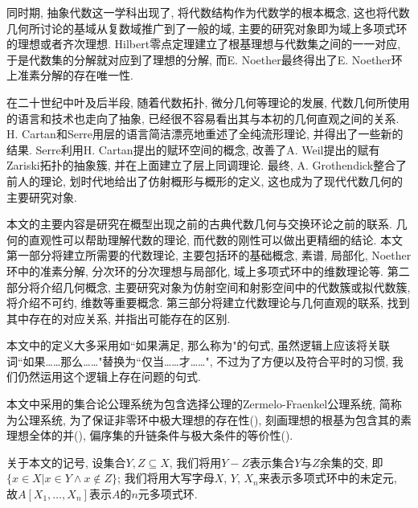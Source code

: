 同时期, 抽象代数这一学科出现了, 将代数结构作为代数学的根本概念, 这也将代数几何所讨论的基域从复数域推广到了一般的域, 主要的研究对象即为域上多项式环的理想或者齐次理想. Hilbert零点定理建立了根基理想与代数集之间的一一对应, 于是代数集的分解就对应到了理想的分解, 而E. Noether最终得出了E. Noether环上准素分解的存在唯一性.

在二十世纪中叶及后半段, 随着代数拓扑, 微分几何等理论的发展, 代数几何所使用的语言和技术也走向了抽象, 已经很不容易看出其与本初的几何直观之间的关系. H. Cartan和Serre用层的语言简洁漂亮地重述了全纯流形理论, 并得出了一些新的结果. Serre利用H. Cartan提出的赋环空间的概念, 改善了A. Weil提出的赋有Zariski拓扑的抽象簇, 并在上面建立了层上同调理论. 最终, A. Grothendick整合了前人的理论, 划时代地给出了仿射概形与概形的定义, 这也成为了现代代数几何的主要研究对象.

本文的主要内容是研究在概型出现之前的古典代数几何与交换环论之前的联系. 几何的直观性可以帮助理解代数的理论, 而代数的刚性可以做出更精细的结论. 本文第一部分将建立所需要的代数理论, 主要包括环的基础概念, 素谱, 局部化, Noether环中的准素分解, 分次环的分次理想与局部化, 域上多项式环中的维数理论等. 第二部分将介绍几何概念, 主要研究对象为仿射空间和射影空间中的代数簇或拟代数簇, 将介绍不可约, 维数等重要概念. 第三部分将建立代数理论与几何直观的联系, 找到其中存在的对应关系, 并指出可能存在的区别.

本文中的定义大多采用如``如果满足, 那么称为"的句式, 虽然逻辑上应该将关联词``如果\dots\dots 那么\dots\dots"替换为``仅当\dots\dots 才\dots\dots ", 不过为了方便以及符合平时的习惯, 我们仍然运用这个逻辑上存在问题的句式.%

本文中采用的集合论公理系统为包含选择公理的Zermelo-Fraenkel公理系统, 简称为公理系统, 为了保证非零环中极大理想的存在性(), 刻画理想的根基为包含其的素理想全体的并(), 偏序集的升链条件与极大条件的等价性().

关于本文的记号, 设集合$Y, Z\subseteq X$, 我们将用$Y-Z$表示集合$Y$与$Z$余集的交, 即$\{x\in X\vert x\in Y\wedge x\notin Z\}$; 我们将用大写字母$X$, $Y$, $X_n$来表示多项式环中的未定元, 故$A[X_1, \dotsc, X_n]$表示$A$的$n$元多项式环.%
